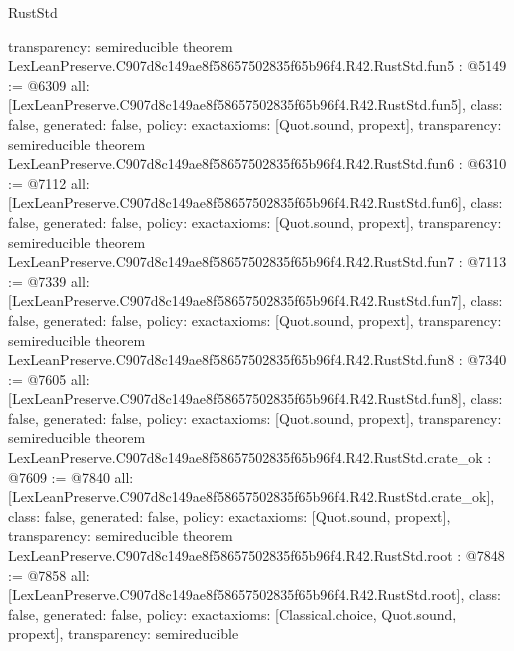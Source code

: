\begin{lexlean}{RustStd}
\begin{coremodule}
{  transparency: semireducible
}
theorem LexLeanPreserve.C907d8c149ae8f58657502835f65b96f4.R42.RustStd.fun5 : @5149 := @6309 {
  all: [LexLeanPreserve.C907d8c149ae8f58657502835f65b96f4.R42.RustStd.fun5],
  class: false,
  generated: false,
  policy: exact{axioms: [Quot.sound, propext]},
  transparency: semireducible
}
theorem LexLeanPreserve.C907d8c149ae8f58657502835f65b96f4.R42.RustStd.fun6 : @6310 := @7112 {
  all: [LexLeanPreserve.C907d8c149ae8f58657502835f65b96f4.R42.RustStd.fun6],
  class: false,
  generated: false,
  policy: exact{axioms: [Quot.sound, propext]},
  transparency: semireducible
}
theorem LexLeanPreserve.C907d8c149ae8f58657502835f65b96f4.R42.RustStd.fun7 : @7113 := @7339 {
  all: [LexLeanPreserve.C907d8c149ae8f58657502835f65b96f4.R42.RustStd.fun7],
  class: false,
  generated: false,
  policy: exact{axioms: [Quot.sound, propext]},
  transparency: semireducible
}
theorem LexLeanPreserve.C907d8c149ae8f58657502835f65b96f4.R42.RustStd.fun8 : @7340 := @7605 {
  all: [LexLeanPreserve.C907d8c149ae8f58657502835f65b96f4.R42.RustStd.fun8],
  class: false,
  generated: false,
  policy: exact{axioms: [Quot.sound, propext]},
  transparency: semireducible
}
theorem LexLeanPreserve.C907d8c149ae8f58657502835f65b96f4.R42.RustStd.crate_ok : @7609 := @7840 {
  all: [LexLeanPreserve.C907d8c149ae8f58657502835f65b96f4.R42.RustStd.crate_ok],
  class: false,
  generated: false,
  policy: exact{axioms: [Quot.sound, propext]},
  transparency: semireducible
}
theorem LexLeanPreserve.C907d8c149ae8f58657502835f65b96f4.R42.RustStd.root : @7848 := @7858 {
  all: [LexLeanPreserve.C907d8c149ae8f58657502835f65b96f4.R42.RustStd.root],
  class: false,
  generated: false,
  policy: exact{axioms: [Classical.choice, Quot.sound, propext]},
  transparency: semireducible
}


\end{coremodule}
\end{lexlean}
